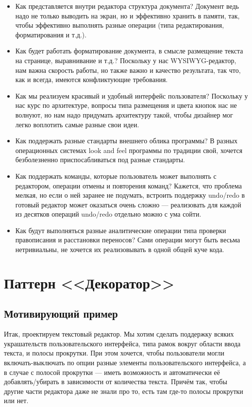 \documentclass{../../text-style}
\begin{document}
\begin{itemize}
    \item Как представляется внутри редактора структура документа? Документ ведь надо не только выводить на экран, но и эффективно хранить в памяти, так, чтобы эффективно выполнять разные операции (типа редактирования, форматирования и т.д.).
    \item Как будет работать форматирование документа, в смысле размещение текста на странице, выравнивание и т.д.? Поскольку у нас WYSIWYG-редактор, нам важна скорость работы, но также важно и качество результата, так что, как и всегда, имеются конфликтующие требования.
    \item Как мы реализуем красивый и удобный интерфейс пользователя? Поскольку у нас курс по архитектуре, вопросы типа размещения и цвета кнопок нас не волнуют, но нам надо придумать архитектуру такой, чтобы дизайнер мог легко воплотить самые разные свои идеи.
    \item Как поддержать разные стандарты внешнего облика программы? В разных операционных системах look and feel программы по традиции свой, хочется безболезненно приспосабливаться под разные стандарты.
    \item Как поддержать команды, которые пользователь может выполнять с редактором, операции отмены и повторения команд? Кажется, что проблема мелкая, но если о ней заранее не подумать, встроить поддержку undo/redo в готовый редактор может оказаться очень сложно --- реализовать для каждой из десятков операций undo/redo отдельно можно с ума сойти.
    \item Как будут выполняться разные аналитические операции типа проверки правописания и расстановки переносов? Сами операции могут быть весьма нетривиальны, не хочется их реализовывать в одной общей куче кода.
\end{itemize}

\section{Паттерн <<Декоратор>>}

\subsection{Мотивирующий пример}

Итак, проектируем текстовый редактор. Мы хотим сделать поддержку всяких украшательств пользовательского интерфейса, типа рамок вокруг области ввода текста, и полосы прокрутки. При этом хочется, чтобы пользователи могли включать-выключать по опции разные элементы пользовательского интерфейса, а в случае с полосой прокрутки --- иметь возможность и автоматически её добавлять/убирать в зависимости от количества текста. Причём так, чтобы другие части редактора даже не знали про то, есть там где-то полосы прокрутки или нет.
\end{document}

